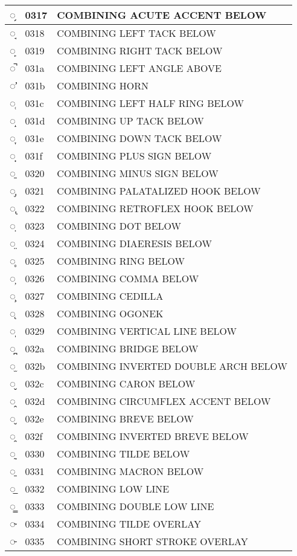 \documentclass[12pt,letterpaper,openany]{book}
\begin{document}
\begin{center}
\begin{supertabular}{|m{0.25in}|m{0.5in}|m{4in}|}
◌̗ & 0317 & COMBINING ACUTE ACCENT BELOW\\\hline
◌̘ & 0318 & COMBINING LEFT TACK BELOW\\\hline
◌̙ & 0319 & COMBINING RIGHT TACK BELOW\\\hline
◌̚ & 031a & COMBINING LEFT ANGLE ABOVE\\\hline
◌̛ & 031b & COMBINING HORN\\\hline
◌̜ & 031c & COMBINING LEFT HALF RING BELOW\\\hline
◌̝ & 031d & COMBINING UP TACK BELOW\\\hline
◌̞ & 031e & COMBINING DOWN TACK BELOW\\\hline
◌̟ & 031f & COMBINING PLUS SIGN BELOW\\\hline
◌̠ & 0320 & COMBINING MINUS SIGN BELOW\\\hline
◌̡ & 0321 & COMBINING PALATALIZED HOOK BELOW\\\hline
◌̢ & 0322 & COMBINING RETROFLEX HOOK BELOW\\\hline
◌̣ & 0323 & COMBINING DOT BELOW\\\hline
◌̤ & 0324 & COMBINING DIAERESIS BELOW\\\hline
◌̥ & 0325 & COMBINING RING BELOW\\\hline
◌̦ & 0326 & COMBINING COMMA BELOW\\\hline
◌̧ & 0327 & COMBINING CEDILLA\\\hline
◌̨ & 0328 & COMBINING OGONEK\\\hline
◌̩ & 0329 & COMBINING VERTICAL LINE BELOW\\\hline
◌̪ & 032a & COMBINING BRIDGE BELOW\\\hline
◌̫ & 032b & COMBINING INVERTED DOUBLE ARCH BELOW\\\hline
◌̬ & 032c & COMBINING CARON BELOW\\\hline
◌̭ & 032d & COMBINING CIRCUMFLEX ACCENT BELOW\\\hline
◌̮ & 032e & COMBINING BREVE BELOW\\\hline
◌̯ & 032f & COMBINING INVERTED BREVE BELOW\\\hline
◌̰ & 0330 & COMBINING TILDE BELOW\\\hline
◌̱ & 0331 & COMBINING MACRON BELOW\\\hline
◌̲ & 0332 & COMBINING LOW LINE\\\hline
◌̳ & 0333 & COMBINING DOUBLE LOW LINE\\\hline
◌̴ & 0334 & COMBINING TILDE OVERLAY\\\hline
◌̵ & 0335 & COMBINING SHORT STROKE OVERLAY\\\hline

\end{supertabular}
\end{center}
\end{document}
